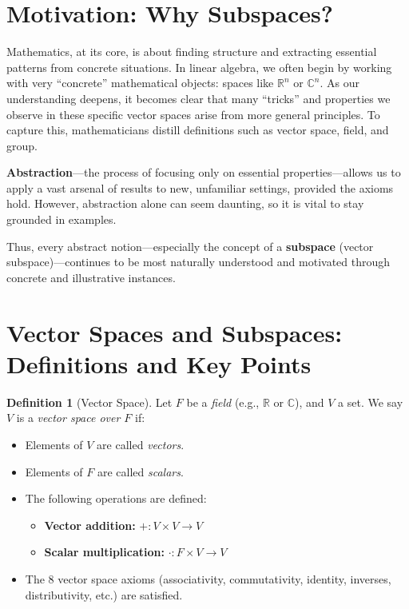\documentclass[11pt,a4paper]{article}
\theoremstyle{definition}
\newtheorem{definition}{Definition}[section]
\theoremstyle{plain}
\theoremstyle{remark}
\begin{document}
\section{Motivation: Why Subspaces?}
Mathematics, at its core, is about finding structure and extracting essential patterns from concrete situations. In linear algebra, we often begin by working with very ``concrete'' mathematical objects: spaces like $\mathbb{R}^n$ or $\mathbb{C}^n$. As our understanding deepens, it becomes clear that many ``tricks'' and properties we observe in these specific vector spaces arise from more general principles. To capture this, mathematicians distill definitions such as vector space, field, and group. 

\textbf{Abstraction}---the process of focusing only on essential properties---allows us to apply a vast arsenal of results to new, unfamiliar settings, provided the axioms hold. However, abstraction alone can seem daunting, so it is vital to stay grounded in examples.

Thus, every abstract notion---especially the concept of a \textbf{subspace} (vector subspace)---continues to be most naturally understood and motivated through concrete and illustrative instances. 

\section{Vector Spaces and Subspaces: Definitions and Key Points}

\begin{definition}[Vector Space]
Let $F$ be a \emph{field} (e.g., $\mathbb{R}$ or $\mathbb{C}$), and $V$ a set. We say $V$ is a \emph{vector space over $F$} if:
\begin{itemize}
    \item Elements of $V$ are called \emph{vectors}.
    \item Elements of $F$ are called \emph{scalars}.
    \item The following operations are defined:
    \begin{itemize}
        \item \textbf{Vector addition:} $+: V \times V \to V$
        \item \textbf{Scalar multiplication:} $\cdot: F \times V \to V$
    \end{itemize}
    \item The 8 vector space axioms (associativity, commutativity, identity, inverses, distributivity, etc.) are satisfied. 
\end{itemize}
\end{definition}
\end{document}
